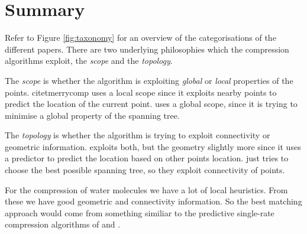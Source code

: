 \documentclass{report}
\begin{document}



\section{Summary}

Refer to Figure \ref{fig:taxonomy} for an overview of the categorisations of
the different papers. There are two underlying philosophies which the
compression algorithms exploit, the \emph{scope} and the \emph{topology}.

The \emph{scope} is whether the algorithm is exploiting \emph{global} or
\emph{local} properties of the points. citet{merrycomp} uses a local scope
since it exploits nearby points to predict the location of the current
point. \citet{chen2005lcp} uses a global scope, since it is trying to minimise
a global property of the spanning tree.

The \emph{topology} is whether the algorithm is trying to exploit connectivity
or geometric information. \citet{gumholdcomp} exploits both, but the geometry
slightly more since it uses a predictor to predict the location based on other
points location. \citet{chen2005lcp} just tries to choose the best possible
spanning tree, so they exploit connectivity of points.

For the compression of water molecules we have a lot of local heuristics. From
these we have good geometric and connectivity information. So the best
matching approach would come from something similiar to the predictive
single-rate compression algorithms of \citet{merrycomp} and
\citet{gumholdcomp}.
\end{document}
